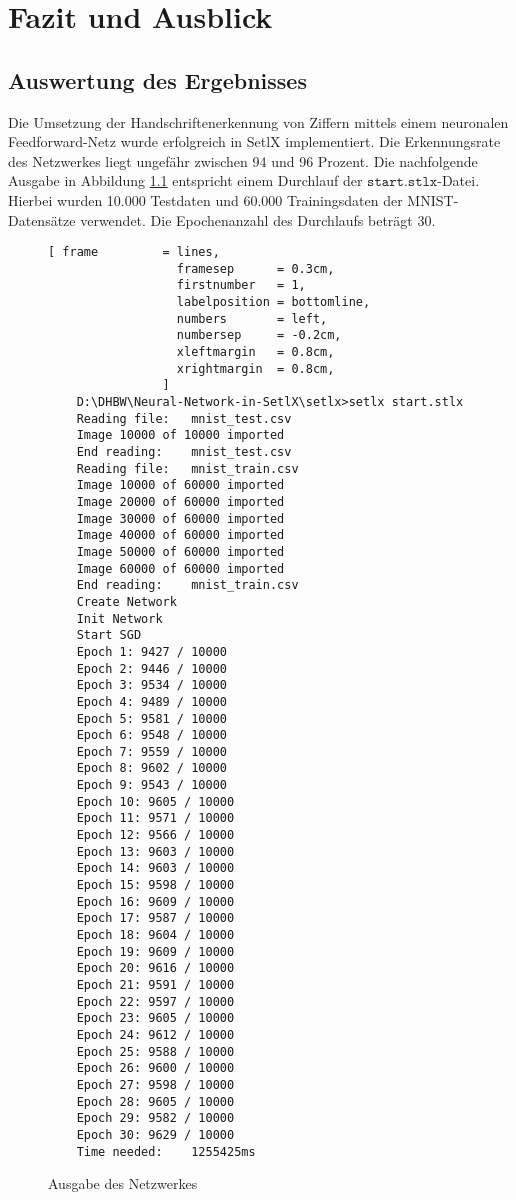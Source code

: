 \chapter{Fazit und Ausblick}

\section{Auswertung des Ergebnisses}
Die Umsetzung der Handschriftenerkennung von Ziffern mittels einem neuronalen Feedforward-Netz wurde erfolgreich in SetlX implementiert. Die Erkennungsrate des Netzwerkes liegt ungefähr zwischen 94 und 96 Prozent. Die nachfolgende Ausgabe in Abbildung \ref{fig:ausgabe_netzwerk} entspricht einem Durchlauf der $\mathtt{start.stlx}$-Datei. Hierbei wurden 10.000 Testdaten und 60.000 Trainingsdaten der MNIST-Datensätze verwendet. Die Epochenanzahl des Durchlaufs beträgt 30.

\begin{figure}
\begin{Verbatim}[ frame         = lines, 
                  framesep      = 0.3cm, 
                  firstnumber   = 1,
                  labelposition = bottomline,
                  numbers       = left,
                  numbersep     = -0.2cm,
                  xleftmargin   = 0.8cm,
                  xrightmargin  = 0.8cm,
                ]
    D:\DHBW\Neural-Network-in-SetlX\setlx>setlx start.stlx
    Reading file:   mnist_test.csv
    Image 10000 of 10000 imported
    End reading:    mnist_test.csv
    Reading file:   mnist_train.csv
    Image 10000 of 60000 imported
    Image 20000 of 60000 imported
    Image 30000 of 60000 imported
    Image 40000 of 60000 imported
    Image 50000 of 60000 imported
    Image 60000 of 60000 imported
    End reading:    mnist_train.csv
    Create Network
    Init Network
    Start SGD
    Epoch 1: 9427 / 10000
    Epoch 2: 9446 / 10000
    Epoch 3: 9534 / 10000
    Epoch 4: 9489 / 10000
    Epoch 5: 9581 / 10000
    Epoch 6: 9548 / 10000
    Epoch 7: 9559 / 10000
    Epoch 8: 9602 / 10000
    Epoch 9: 9543 / 10000
    Epoch 10: 9605 / 10000
    Epoch 11: 9571 / 10000
    Epoch 12: 9566 / 10000
    Epoch 13: 9603 / 10000
    Epoch 14: 9603 / 10000
    Epoch 15: 9598 / 10000
    Epoch 16: 9609 / 10000
    Epoch 17: 9587 / 10000
    Epoch 18: 9604 / 10000
    Epoch 19: 9609 / 10000
    Epoch 20: 9616 / 10000
    Epoch 21: 9591 / 10000
    Epoch 22: 9597 / 10000
    Epoch 23: 9605 / 10000
    Epoch 24: 9612 / 10000
    Epoch 25: 9588 / 10000
    Epoch 26: 9600 / 10000
    Epoch 27: 9598 / 10000
    Epoch 28: 9605 / 10000
    Epoch 29: 9582 / 10000
    Epoch 30: 9629 / 10000
    Time needed:    1255425ms		
\end{Verbatim}
\vspace*{-0.3cm}
\caption{Ausgabe des Netzwerkes}
\label{fig:ausgabe_netzwerk}
\end{figure}


